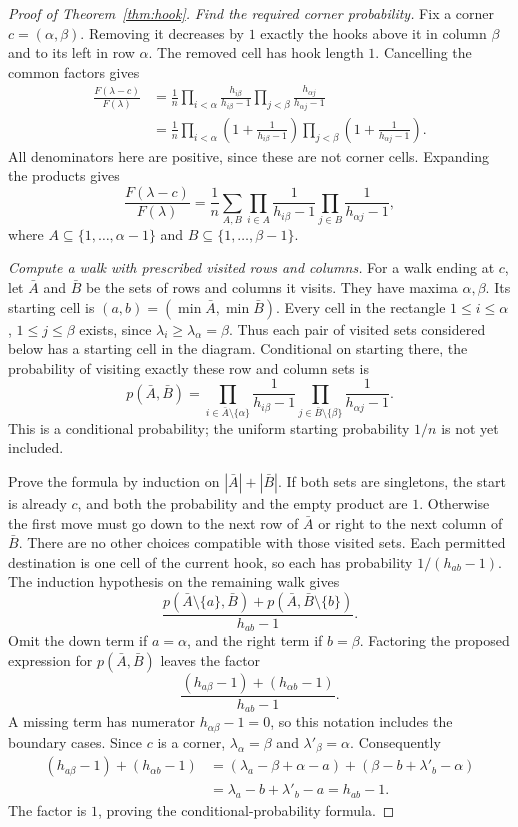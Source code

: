 \begin{proof}[Proof of Theorem~\ref{thm:hook}]
\emph{Find the required corner probability.}
Fix a corner $c=(\alpha,\beta)$. Removing it decreases by $1$ exactly the hooks above it in column $\beta$ and to its left in row $\alpha$. The removed cell has hook length $1$. Cancelling the common factors gives
\begin{align*}
\frac{F(\lambda-c)}{F(\lambda)}
&=\frac1n\prod_{i<\alpha}\frac{h_{i\beta}}{h_{i\beta}-1}
\prod_{j<\beta}\frac{h_{\alpha j}}{h_{\alpha j}-1}\\
&=\frac1n\prod_{i<\alpha}\left(1+\frac1{h_{i\beta}-1}\right)
\prod_{j<\beta}\left(1+\frac1{h_{\alpha j}-1}\right).
\end{align*}
All denominators here are positive, since these are not corner cells. Expanding the products gives
\begin{equation}\label{eq:hooktarget}
\frac{F(\lambda-c)}{F(\lambda)}
=\frac1n\sum_{A,B}
\prod_{i\in A}\frac1{h_{i\beta}-1}
\prod_{j\in B}\frac1{h_{\alpha j}-1},
\end{equation}
where $A\subseteq\{1,\ldots,\alpha-1\}$ and $B\subseteq\{1,\ldots,\beta-1\}$.

\emph{Compute a walk with prescribed visited rows and columns.}
For a walk ending at $c$, let $\bar A$ and $\bar B$ be the sets of rows and columns it visits. They have maxima $\alpha,\beta$. Its starting cell is $(a,b)=(\min\bar A,\min\bar B)$. Every cell in the rectangle $1\le i\le\alpha$, $1\le j\le\beta$ exists, since $\lambda_i\ge\lambda_\alpha=\beta$. Thus each pair of visited sets considered below has a starting cell in the diagram. Conditional on starting there, the probability of visiting exactly these row and column sets is
\[
p(\bar A,\bar B)
=\prod_{i\in\bar A\setminus\{\alpha\}}\frac1{h_{i\beta}-1}
\prod_{j\in\bar B\setminus\{\beta\}}\frac1{h_{\alpha j}-1}.
\]
This is a conditional probability; the uniform starting probability $1/n$ is not yet included.

Prove the formula by induction on $|\bar A|+|\bar B|$. If both sets are singletons, the start is already $c$, and both the probability and the empty product are $1$. Otherwise the first move must go down to the next row of $\bar A$ or right to the next column of $\bar B$. There are no other choices compatible with those visited sets. Each permitted destination is one cell of the current hook, so each has probability $1/(h_{ab}-1)$. The induction hypothesis on the remaining walk gives
\[
\frac{p(\bar A\setminus\{a\},\bar B)
+p(\bar A,\bar B\setminus\{b\})}{h_{ab}-1}.
\]
Omit the down term if $a=\alpha$, and the right term if $b=\beta$. Factoring the proposed expression for $p(\bar A,\bar B)$ leaves the factor
\[
\frac{(h_{a\beta}-1)+(h_{\alpha b}-1)}{h_{ab}-1}.
\]
A missing term has numerator $h_{\alpha\beta}-1=0$, so this notation includes the boundary cases. Since $c$ is a corner, $\lambda_\alpha=\beta$ and $\lambda'_\beta=\alpha$. Consequently
\begin{align*}
(h_{a\beta}-1)+(h_{\alpha b}-1)
&=(\lambda_a-\beta+\alpha-a)
 +(\beta-b+\lambda'_b-\alpha)\\
&=\lambda_a-b+\lambda'_b-a=h_{ab}-1.
\end{align*}
The factor is $1$, proving the conditional-probability formula.


\end{proof}

